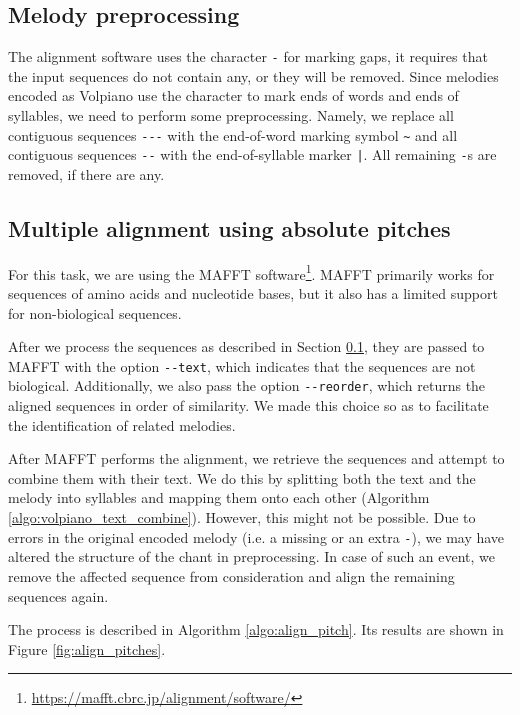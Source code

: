 \subsection{Melody preprocessing}
\label{section:vol_preprocess}

The alignment software uses the character \verb|-| for marking gaps,
it requires that the input sequences do not contain any, or they will be removed. Since melodies encoded as Volpiano use the character to mark ends of words
and ends of syllables, we need to perform some preprocessing. Namely, we replace all contiguous sequences \verb|---| with the end-of-word marking symbol \verb|~|
and all contiguous sequences \verb|--| with the end-of-syllable marker \verb=|=. All remaining \verb|-|s are removed, if there are any.

\subsection{Multiple alignment using absolute pitches}

For this task, we are using the MAFFT software\footnote{\url{https://mafft.cbrc.jp/alignment/software/}}.
MAFFT primarily works for sequences of amino acids and nucleotide bases, but it also has a limited support for non-biological sequences.

After we process the sequences as described in Section \ref{section:vol_preprocess}, they are passed to MAFFT with the option \verb|--text|, which
indicates that the sequences are not biological. Additionally, we also pass the option \verb|--reorder|, which returns the aligned sequences in order 
of similarity. We made this choice so as to facilitate the identification of related melodies.

After MAFFT performs the alignment, we retrieve the sequences and attempt to combine them with their text.
We do this by splitting both the text and the melody into syllables and mapping them onto each other (Algorithm \ref{algo:volpiano_text_combine}). 
However, this might not be possible. Due to errors in the original encoded melody (i.e. a missing or an extra \verb|-|),
we may have altered the structure of the chant in preprocessing. In case of such an event, we remove the affected sequence from consideration and align the remaining
sequences again.

The process is described in Algorithm \ref{algo:align_pitch}. Its results are shown in Figure \ref{fig:align_pitches}.\newline

